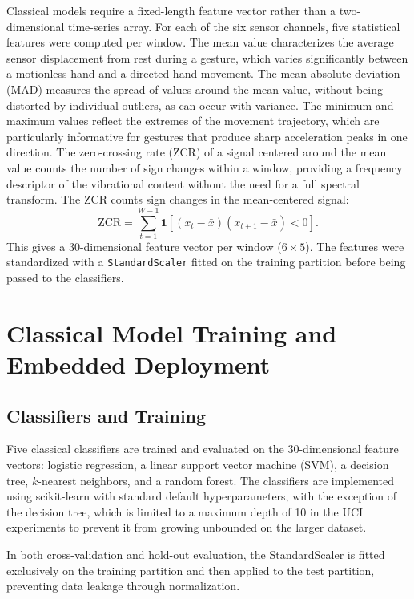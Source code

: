 Classical models require a fixed-length feature vector rather than a two-dimensional time-series array. For each of the six sensor channels, five statistical features were computed per window. The mean value characterizes the average sensor displacement from rest during a gesture, which varies significantly between a motionless hand and a directed hand movement. The mean absolute deviation (MAD) measures the spread of values around the mean value, without being distorted by individual outliers, as can occur with variance. The minimum and maximum values reflect the extremes of the movement trajectory, which are particularly informative for gestures that produce sharp acceleration peaks in one direction. The zero-crossing rate (ZCR) of a signal centered around the mean value counts the number of sign changes within a window, providing a frequency descriptor of the vibrational content without the need for a full spectral transform.
The ZCR counts sign changes in the mean-centered signal:
\begin{equation}
  \text{ZCR} = \sum_{t=1}^{W-1}
    \mathbf{1}\!\left[(x_t - \bar{x})(x_{t+1} - \bar{x}) < 0\right].
\end{equation}
This gives a 30-dimensional feature vector per window ($6 \times 5$). The features were standardized with a \texttt{StandardScaler} fitted on the training partition before being passed to the classifiers. 

\section{Classical Model Training and Embedded Deployment}
\label{sec:classical_training}

\subsection{Classifiers and Training}

Five classical classifiers are trained and evaluated on the 30-dimensional feature vectors: logistic regression, a linear support vector machine (SVM), a decision tree, $k$-nearest neighbors, and a random forest. The classifiers are implemented using scikit-learn with standard default hyperparameters, with the exception of the decision tree, which is limited to a maximum depth of 10 in the UCI experiments to prevent it from growing unbounded on the larger dataset.

In both cross-validation and hold-out evaluation, the StandardScaler is fitted exclusively on the training partition and then applied to the test partition, preventing data leakage through normalization.

